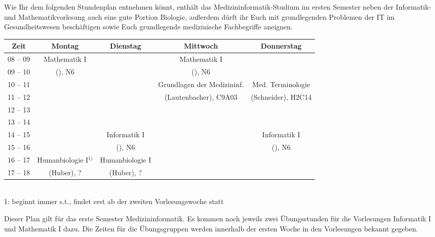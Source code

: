 Wie Ihr dem folgenden Stundenplan entnehmen könnt, enthält das Medizininformatik-Studium im ersten Semester neben der Informatik- und Mathematikvorlesung auch eine gute Portion Biologie, außerdem dürft ihr Euch mit grundlegenden Problemen der IT im Gesundheitswesen beschäftigen sowie Euch grundlegende medizinische Fachbegriffe aneignen.

\begin{minipage}{\textwidth}
    \footnotesize
\begin{center}
	\begin{tabular}{|c|c|c|c|c|} \hline
		Zeit      & 			Montag 		& Dienstag			& Mittwoch 						& Donnerstag 			 \\
		\hline\hline
		08 -- 09  & 		Mathematik I 	&  					& Mathematik I 					&  						\\
		\cline{1-1}\cline{3-3}\cline{5-5}			
		09 -- 10  & 	(\Matheprof), N6    & 					& (\Matheprof), N6 				 &  						\\
		\hline
		10 -- 11  &							&					& Grundlagen der Medizininf.	& Med. Terminologie		\\
		\cline{1-3}
		11 -- 12  & 						&  					& (Lautenbacher), C9A03			&(Schneider), H2C14		\\
		\hline
		12 -- 13 & 							& 				 	& 				    			& 						 \\
		\hline
		13 -- 14 & 							& 					& 								& 						 \\
		\hline
		14 -- 15 & 							& Informatik I 		& 								& Informatik I 			\\
		\cline{1-2}\cline{4-4}
		15 -- 16 &							& (\Infoprof), N6 	& 								& (\Infoprof), N6 		\\
		\hline
		16 -- 17 & Humanbiologie I$^{1)}$	& Humanbiologie I   & & \\
		\cline{1-1}\cline{4-5}
		17 -- 18 & (Huber), ?				& (Huber), ?		& &  \\
		\hline
	\end{tabular}
    ~\\
\scriptsize	
1: beginnt immer s.t., findet erst ab der zweiten Vorlesungswoche statt\\
\end{center}
\end{minipage}
Dieser Plan gilt für das erste Semester Medizininformatik. Es kommen noch jeweils zwei Übungsstunden für die Vorlesungen 
Informatik I und Mathematik I dazu. Die Zeiten für die Übungsgruppen werden innerhalb der ersten Woche in den Vorlesungen bekannt gegeben.
